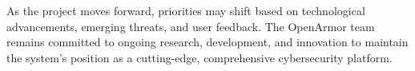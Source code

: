 As the project moves forward, priorities may shift based on technological advancements, emerging threats, and user feedback. The OpenArmor team remains committed to ongoing research, development, and innovation to maintain the system's position as a cutting-edge, comprehensive cybersecurity platform.